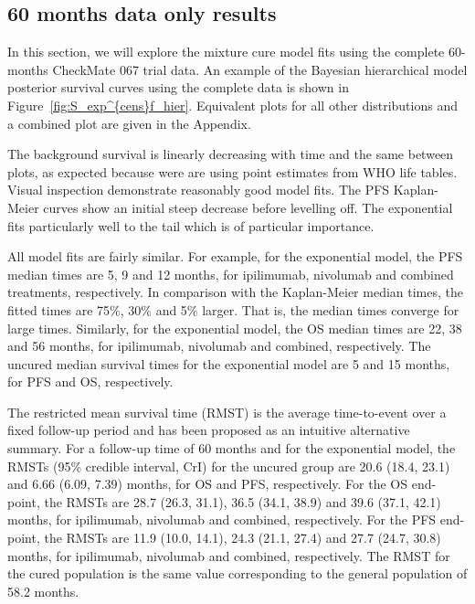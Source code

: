 \documentclass[AMA,STIX1COL]{WileyNJD-v2}
\begin{document}
%
\subsection{60 months data only results} \label{sec:results}
In this section, we will explore the mixture cure model fits using the complete 60-months CheckMate 067 trial data.
An example of the Bayesian hierarchical model posterior survival curves using the complete data is shown in Figure~\ref{fig:S_exp^{cens}f_hier}.
Equivalent plots for all other distributions and a combined plot are given in the Appendix.

The background survival is linearly decreasing with time and the same between plots, as expected because were are using point estimates from WHO life tables.
Visual inspection demonstrate reasonably good model fits.
The PFS Kaplan-Meier curves show an initial steep decrease before levelling off.
The exponential fits particularly well to the tail which is of particular importance.

All model fits are fairly similar. For example, for the exponential model, the PFS median times are 5, 9 and 12 months, for ipilimumab, nivolumab and combined treatments, respectively.
In comparison with the Kaplan-Meier median times, the fitted times are 75\%, 30\% and 5\% larger. That is, the median times converge for large times.
Similarly, for the exponential model, the OS median times are 22, 38 and 56 months, for ipilimumab, nivolumab and combined, respectively.
The uncured median survival times for the exponential model are 5 and 15 months, for PFS and OS, respectively.

The restricted mean survival time (RMST) is the average time-to-event over a fixed follow-up period and has been proposed as an intuitive alternative summary.
For a follow-up time of 60 months and for the exponential model, the RMSTs (95\% credible interval, CrI) for the uncured group are 20.6 (18.4, 23.1) and 6.66 (6.09, 7.39) months, for OS and PFS, respectively. 
For the OS end-point, the RMSTs are 28.7 (26.3, 31.1), 36.5 (34.1, 38.9) and 39.6 (37.1, 42.1) months, for ipilimumab, nivolumab and combined, respectively.
For the PFS end-point, the RMSTs are 11.9 (10.0, 14.1), 24.3 (21.1, 27.4) and 27.7 (24.7, 30.8) months, for ipilimumab, nivolumab and combined, respectively.
The RMST for the cured population is the same value corresponding to the general population of 58.2 months.

\end{document}

